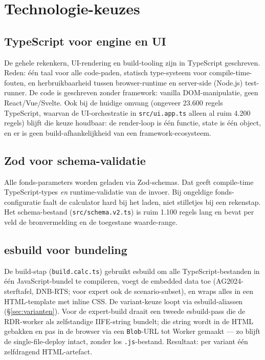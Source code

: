 \documentclass[11pt,a4paper]{article}
\newcommand{\code}[1]{\texttt{#1}}
\begin{document}
\section{Technologie-keuzes}
\label{sec:tech}

\subsection{TypeScript voor engine en UI}

De gehele rekenkern, UI-rendering en build-tooling zijn in TypeScript geschreven. Reden: één taal voor alle code-paden, statisch type-systeem voor compile-time-fouten, en herbruikbaarheid tussen browser-runtime en server-side (Node.js) test-runner. De code is geschreven zonder framework: vanilla DOM-manipulatie, geen React/Vue/Svelte. Ook bij de huidige omvang (ongeveer 23.600 regels TypeScript, waarvan de UI-orchestratie in \code{src/ui.app.ts} alleen al ruim 4.200 regels) blijft die keuze houdbaar: de render-loop is één functie, state is één object, en er is geen build-afhankelijkheid van een framework-ecosysteem.

\subsection{Zod voor schema-validatie}

Alle fonds-parameters worden geladen via Zod-schemas. Dat geeft compile-time TypeScript-types \emph{en} runtime-validatie van de invoer. Bij ongeldige fonds-configuratie faalt de calculator hard bij het laden, niet stilletjes bij een rekenstap. Het schema-bestand (\code{src/schema.v2.ts}) is ruim 1.100 regels lang en bevat per veld de bronvermelding en de toegestane waarde-range.

\subsection{esbuild voor bundeling}

De build-stap (\code{build.calc.ts}) gebruikt esbuild om alle TypeScript-bestanden in \'e\'en JavaScript-bundel te compileren, voegt de embedded data toe (AG2024-sterftafel, DNB-RTS; voor expert ook de scenario-subset), en wraps alles in een HTML-template met inline CSS. De variant-keuze loopt via esbuild-aliassen (\S\ref{sec:varianten}). Voor de expert-build draait een tweede esbuild-pass die de RDR-worker als zelfstandige IIFE-string bundelt; die string wordt in de HTML gebakken en pas in de browser via een \code{Blob}-URL tot Worker gemaakt --- zo blijft de single-file-deploy intact, zonder los \code{.js}-bestand. Resultaat: per variant één zelfdragend HTML-artefact.
\end{document}
